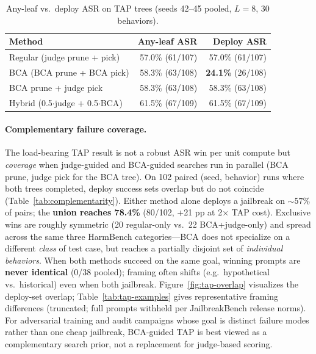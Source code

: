 \documentclass{article}
\newcommand{\BCA}{\textsc{BCA}}
\newcommand{\ASR}{\textsc{ASR}}
\begin{document}
\begin{table}[t]
\centering
\small
\caption{Any-leaf vs.\ deploy \ASR{} on \textsc{TAP} trees (seeds 42--45 pooled, $L{=}8$, 30 behaviors).}
\label{tab:deploy}
\begin{tabular}{lrr}
\toprule
Method & Any-leaf \ASR{} & Deploy \ASR{} \\
\midrule
Regular (judge prune + pick) & 57.0\% (61/107) & 57.0\% (61/107) \\
\BCA{} (BCA prune + BCA pick) & 58.3\% (63/108) & \textbf{24.1\%} (26/108) \\
\BCA{} prune + judge pick & 58.3\% (63/108) & 58.3\% (63/108) \\
Hybrid (0.5$\cdot$judge + 0.5$\cdot$\BCA) & 61.5\% (67/109) & 61.5\% (67/109) \\
\bottomrule
\end{tabular}
\end{table}

\paragraph{Complementary failure coverage.}
The load-bearing \textsc{TAP} result is not a robust \ASR{} win per unit compute but \emph{coverage} when judge-guided and \BCA{}-guided searches run in parallel (BCA prune, judge pick for the BCA tree).
On 102 paired (seed, behavior) runs where both trees completed, deploy success sets overlap but do not coincide (Table~\ref{tab:complementarity}).
Either method alone deploys a jailbreak on ${\sim}57\%$ of pairs; the \textbf{union reaches 78.4\%} (80/102, +21 pp at 2$\times$ \textsc{TAP} cost).
Exclusive wins are roughly symmetric (20 regular-only vs.\ 22 \BCA{}+judge-only) and spread across the same three HarmBench categories---\BCA{} does not specialize on a different \emph{class} of test case, but reaches a partially disjoint set of \emph{individual behaviors}.
When both methods succeed on the same goal, winning prompts are \textbf{never identical} (0/38 pooled); framing often shifts (e.g.\ hypothetical vs.\ historical) even when both jailbreak.
Figure~\ref{fig:tap-overlap} visualizes the deploy-set overlap; Table~\ref{tab:tap-examples} gives representative framing differences (truncated; full prompts withheld per JailbreakBench release norms).
For adversarial training and audit campaigns whose goal is distinct failure modes rather than one cheap jailbreak, \BCA{}-guided \textsc{TAP} is best viewed as a complementary search prior, not a replacement for judge-based scoring.
\end{document}

